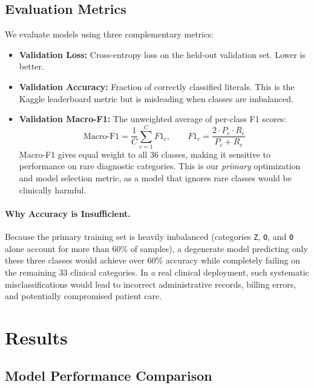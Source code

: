 \documentclass[10pt,a4paper,twocolumn]{article}
\begin{document}
\subsection{Evaluation Metrics}

We evaluate models using three complementary metrics:

\begin{itemize}
  \item \textbf{Validation Loss:} Cross-entropy loss on the held-out validation
        set. Lower is better.
  \item \textbf{Validation Accuracy:} Fraction of correctly classified literals.
        This is the Kaggle leaderboard metric but is misleading when classes are
        imbalanced.
  \item \textbf{Validation Macro-F1:} The unweighted average of per-class F1
        scores:
        \begin{equation}
          \text{Macro-F1} = \frac{1}{C} \sum_{c=1}^{C} F1_c, \qquad F1_c = \frac{2 \cdot P_c \cdot R_c}{P_c + R_c}
        \end{equation}
        Macro-F1 gives equal weight to all 36 classes, making it sensitive to
        performance on rare diagnostic categories. This is our \emph{primary}
        optimization and model selection metric, as a model that ignores rare
        classes would be clinically harmful.
\end{itemize}

\paragraph{Why Accuracy is Insufficient.}
Because the primary training set is heavily imbalanced (categories \texttt{Z},
\texttt{O}, and \texttt{0} alone account for more than 60\% of samples), a
degenerate model predicting only these three classes would achieve over 60\%
accuracy while completely failing on the remaining 33 clinical categories. In
a real clinical deployment, such systematic misclassifications would lead to
incorrect administrative records, billing errors, and potentially compromised
patient care.

\section{Results}
\label{sec:results}

\subsection{Model Performance Comparison}
\end{document}
